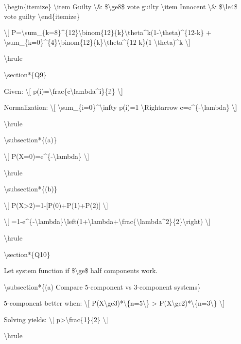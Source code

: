 \textbackslash begin\{itemize\} \textbackslash item Guilty
\textbackslash\& \$\textbackslash ge8\$ vote guilty \textbackslash item
Innocent \textbackslash\& \$\textbackslash le4\$ vote guilty
\textbackslash end\{itemize\}

\textbackslash{[}
P=\textbackslash sum\_\{k=8\}\^{}\{12\}\textbackslash binom\{12\}\{k\}\textbackslash theta\^{}k(1-\textbackslash theta)\^{}\{12-k\}
+
\textbackslash sum\_\{k=0\}\^{}\{4\}\textbackslash binom\{12\}\{k\}\textbackslash theta\^{}\{12-k\}(1-\textbackslash theta)\^{}k
\textbackslash{]}

\textbackslash hrule

\textbackslash section*\{Q9\}

Given: \textbackslash{[}
p(i)=\textbackslash frac\{c\textbackslash lambda\^{}i\}\{i!\}
\textbackslash{]}

Normalization: \textbackslash{[}
\textbackslash sum\_\{i=0\}\^{}\textbackslash infty p(i)=1
\textbackslash Rightarrow c=e\^{}\{-\textbackslash lambda\}
\textbackslash{]}

\textbackslash hrule

\textbackslash subsection*\{(a)\}

\textbackslash{[} P(X=0)=e\^{}\{-\textbackslash lambda\}
\textbackslash{]}

\textbackslash hrule

\textbackslash subsection*\{(b)\}

\textbackslash{[} P(X\textgreater2)=1-{[}P(0)+P(1)+P(2){]}
\textbackslash{]}

\textbackslash{[}
=1-e\^{}\{-\textbackslash lambda\}\textbackslash left(1+\textbackslash lambda+\textbackslash frac\{\textbackslash lambda\^{}2\}\{2\}\textbackslash right)
\textbackslash{]}

\textbackslash hrule

\textbackslash section*\{Q10\}

Let system function if \$\textbackslash ge\$ half components work.

\textbackslash subsection*\{(a) Compare 5-component vs 3-component
systems\}

5-component better when: \textbackslash{[}
P(X\textbackslash ge3)*\textbackslash\{n=5\textbackslash\}
\textgreater{}
P(X\textbackslash ge2)*\textbackslash\{n=3\textbackslash\}
\textbackslash{]}

Solving yields: \textbackslash{[}
p\textgreater\textbackslash frac\{1\}\{2\} \textbackslash{]}

\textbackslash hrule

